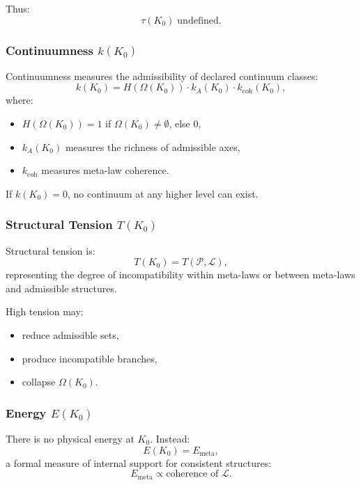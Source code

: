 Thus:
\[
\tau(K_0) \;\text{undefined}.
\]

\subsubsection{Continuumness \texorpdfstring{$k(K_0)$}{k(K_0)}}

Continuumness measures the admissibility of declared continuum classes:
\[
k(K_0) = 
H(\Omega(K_0)) \cdot
k_A(K_0) \cdot
k_{\mathrm{coh}}(K_0),
\]
where:
\begin{itemize}
    \item $H(\Omega(K_0)) = 1$ if $\Omega(K_0)\neq\emptyset$, else $0$,
    \item $k_A(K_0)$ measures the richness of admissible axes,
    \item $k_{\mathrm{coh}}$ measures meta-law coherence.
\end{itemize}

If $k(K_0)=0$, no continuum at any higher level can exist.

\subsubsection{Structural Tension \texorpdfstring{$T(K_0)$}{T(K_0)}}

Structural tension is:
\[
T(K_0) = T(\mathcal{P}, \mathcal{L}),
\]
representing the degree of incompatibility within meta-laws or between
meta-laws and admissible structures.

High tension may:
\begin{itemize}
    \item reduce admissible sets,
    \item produce incompatible branches,
    \item collapse $\Omega(K_0)$.
\end{itemize}

\subsubsection{Energy \texorpdfstring{$E(K_0)$}{E(K_0)}}

There is no physical energy at $K_0$.  
Instead:
\[
E(K_0) = E_{\mathrm{meta}},
\]
a formal measure of internal support for consistent structures:
\[
E_{\mathrm{meta}} \propto \text{coherence of }\mathcal{L}.
\]

